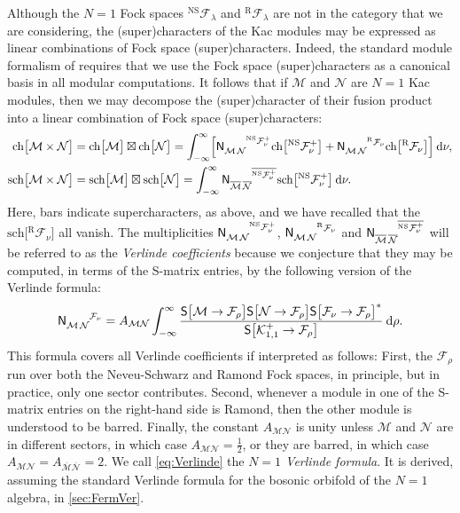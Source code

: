 \documentclass[a4paper,reqno,12pt]{report}
\theoremstyle{definition}
\numberwithin{equation}{section}
\let\originalleft\left     %
\let\originalright\right
\renewcommand{\left}{\mathopen{}\mathclose\bgroup\originalleft}
\renewcommand{\right}{\aftergroup\egroup\originalright}
\newcommand{\sqbrac}[1]{\left[ #1 \right]}
\newcommand{\dd}{\mathrm{d}}   %
\newcommand{\ra}{\rightarrow}
\newcommand{\Kac}[1]{\mathcal{K}_{#1}}       %
\newcommand{\Fock}[1]{\mathcal{F}_{#1}}      %
\newcommand{\chmap}{\mathrm{ch}}
\newcommand{\schmap}{\mathrm{sch}}
\newcommand{\Gr}[1]{\bigl[ #1 \bigr]}            %
\newcommand{\ch}[1]{\chmap \Gr{#1}}              %
\newcommand{\sch}[1]{\schmap \Gr{#1}}              %
\newcommand{\modS}{\mathsf{S}} %
\newcommand{\Smat}[2]{\modS \bigl[ #1 \ra #2 \bigr]}  %
\newcommand{\fuse}{\mathbin{\times}}                                            %
\newcommand{\Grfuse}{\mathbin{\boxtimes}}                                       %
\newcommand{\fuscoeff}[3]{\mathsf{N}_{#1 \, #2}^{\hphantom{#1 \, #2} #3}}       %
\newcommand{\rhs}{right-hand side}
\newcommand{\ns}{Neveu-Schwarz}
\theoremstyle{plain}
\newcommand{\Mod}[1]{\mathcal{#1}}                 %
\newcommand{\NSFock}[1]{{}^{\text{NS}}\Fock{#1}}   %
\newcommand{\RFock}[1]{{}^{\text{R}}\Fock{#1}}     %
\begin{document}
Although the $N=1$ Fock spaces $\NSFock{\lambda}$ and $\RFock{\lambda}$ are not in the category that we are considering, the (super)characters of the Kac modules may be expressed as linear combinations of Fock space (super)characters.  Indeed, the standard module formalism of \cite{CreLog13,RidVer14} requires that we use the Fock space (super)characters as a canonical basis in all modular computations.  It follows that if $\Mod{M}$ and $\Mod{N}$ are $N=1$ Kac modules, then we may decompose the (super)character of their fusion product into a linear combination of Fock space (super)characters:
\begin{equation} \label{eq:VerChSch}
\begin{aligned}
\ch{\Mod{M} \fuse \Mod{N}} &= \ch{\Mod{M}} \Grfuse \ch{\Mod{N}} = \int_{-\infty}^{\infty} \sqbrac{\fuscoeff{\Mod{M}}{\Mod{N}}{\NSFock{\nu}^+} \ch{\NSFock{\nu}^+} + \fuscoeff{\Mod{M}}{\Mod{N}}{\RFock{\nu}} \ch{\RFock{\nu}}} \: \dd \nu, \\
\sch{\Mod{M} \fuse \Mod{N}} &= \sch{\Mod{M}} \Grfuse \sch{\Mod{N}} = \int_{-\infty}^{\infty} \fuscoeff{\overline{\Mod{M}}}{\overline{\Mod{N}}}{\overline{\NSFock{\nu}^+}} \sch{\NSFock{\nu}^+} \: \dd \nu.
\end{aligned}
\end{equation}
Here, bars indicate supercharacters, as above, and we have recalled that the $\sch{\RFock{\nu}}$ all vanish.  The multiplicities $\fuscoeff{\Mod{M}}{\Mod{N}}{\NSFock{\nu}^+}$, $\fuscoeff{\Mod{M}}{\Mod{N}}{\RFock{\nu}}$ and $\fuscoeff{\overline{\Mod{M}}}{\overline{\Mod{N}}}{\overline{\NSFock{\nu}^+}}$ will be referred to as the \emph{Verlinde coefficients} because we conjecture that they may be computed, in terms of the S-matrix entries, by the following version of the Verlinde formula:
\begin{equation} \label{eq:Verlinde}
\fuscoeff{\Mod{M}}{\Mod{N}}{\Fock{\nu}} = A_{\Mod{M} \Mod{N}} \int_{-\infty}^{\infty} \frac{\Smat{\Mod{M}}{\Fock{\rho}} \Smat{\Mod{N}}{\Fock{\rho}} \Smat{\Fock{\nu}}{\Fock{\rho}}^*}{\Smat{\Kac{1,1}^+}{\Fock{\rho}}} \: \dd \rho.
\end{equation}
This formula covers all Verlinde coefficients if interpreted as follows:  First, the $\Fock{\rho}$ run over both the \ns{} and Ramond Fock spaces, in principle, but in practice, only one sector contributes.  Second, whenever a module in one of the S-matrix entries on the \rhs{} is Ramond, then the other module is understood to be barred.  Finally, the constant $A_{\Mod{M} \Mod{N}}$ is unity unless $\Mod{M}$ and $\Mod{N}$ are in different sectors, in which case $A_{\Mod{M} \Mod{N}} = \frac{1}{2}$, or they are barred, in which case $A_{\Mod{M} \Mod{N}} = A_{\overline{\Mod{M}} \overline{\Mod{N}}} = 2$.  We call \eqref{eq:Verlinde} the \emph{$N=1$ Verlinde formula}.  It is derived, assuming the standard Verlinde formula for the bosonic orbifold of the $N=1$ algebra, in \cref{sec:FermVer}.
\end{document}
